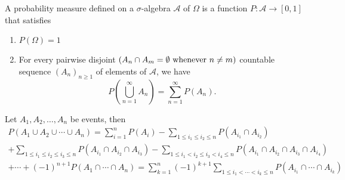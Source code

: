 \documentclass[../main.tex]{subfiles}
\begin{document}
\begin{definition}\label{def:probability}
A probability measure defined on a $ \sigma $-algebra $\mathcal{A}$ of $\Omega$ is a function $ P: \mathcal{A} \to [0,1] $ that satisfies 
\begin{enumerate}
    \item $P(\Omega)=1$
    \item For every pairwise disjoint $ (A_n \cap A_m = \emptyset \textnormal{ whenever } n \neq m) $ countable sequence $ (A_n)_{n \geq 1} $ of elements of $\mathcal{A}$, we have 
    \[
    P\left(\bigcup^\infty_{n=1}{A_n}\right) = \sum^\infty_{n=1}{P(A_n)}.
    \]
\end{enumerate}
\end{definition}



\begin{theorem}\label{thm:additivity of nondisjoint sets}
    Let \(A_1, A_2, \dots, A_n\) be events, then
\begin{gather*} P(A_1 \cup A_2 \cup \cdots \cup A_n) = \sum_{i=1}^{n}{P(A_i)} - \sum_{1 \leq i_1 \leq i_2 \leq n}{P(A_{i_1} \cap A_{i_2})}\\ + \sum_{1 \leq i_1 \leq i_2 \leq i_3 \leq n}{P(A_{i_1} \cap A_{i_2} \cap A_{i_3})} - \sum_{1 \leq i_1 < i_2 \leq i_3 < i_4 \leq n}{P(A_{i_1} \cap A_{i_2} \cap A_{i_3} \cap A_{i_4})} \\ + \cdots + (-1)^{n+1}P(A_1 \cap \cdots \cap A_n)  = \sum_{k=1}^{n}(-1)^{k+1} \sum_{1 \leq i_1 < \cdots < i_k \leq n}{P(A_{i_1} \cap \cdots \cap A_{i_k})} 
\end{gather*}
    
\end{theorem}
    
\end{document}
